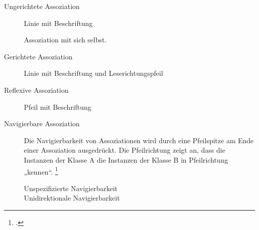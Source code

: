 \documentclass{lehramt-informatik-haupt}
\begin{document}
\begin{description}
\item[Ungerichtete Assoziation]
Linie mit Beschriftung


Assoziation mit sich selbst.


\item[Gerichtete Assoziation]
Linie mit Beschriftung und Leserichtungspfeil


\item[Reflexive Assoziation]
Pfeil mit Beschriftung

%

\item[Navigierbare Assoziation]

Die Navigierbarkeit von Assoziationen wird durch eine Pfeilspitze am
Ende einer Assoziation ausgedrückt. Die Pfeilrichtung zeigt an, dass die
Instanzen der Klasse A die Instanzen der Klasse B in Pfeilrichtung
„kennen“.
\footcite[Seite 150]{rupp}

%

\begin{description}
\item[Unspezifizierte Navigierbarkeit] 


%

\item[Unidirektionale Navigierbarkeit] 

\end{description}
\end{description}
\end{document}
